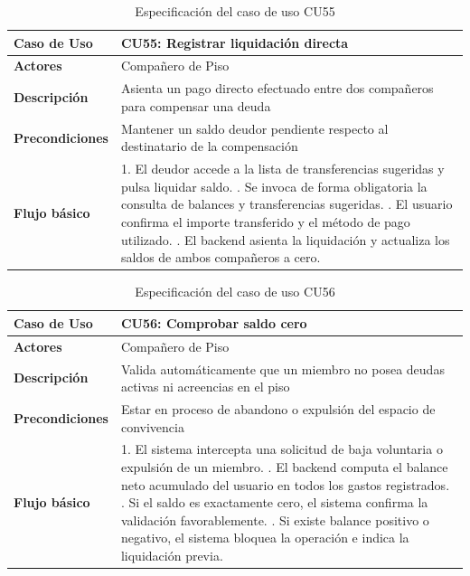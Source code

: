 \begin{table}[H]
\centering
\begin{tabular}{|p{3.2cm}|p{11.3cm}|}
\hline
\textbf{Caso de Uso} & \textbf{CU55: Registrar liquidación directa} \\ \hline
\textbf{Actores} & Compañero de Piso \\ \hline
\textbf{Descripción} & Asienta un pago directo efectuado entre dos compañeros para compensar una deuda \\ \hline
\textbf{Precondiciones} & Mantener un saldo deudor pendiente respecto al destinatario de la compensación \\ \hline
\textbf{Flujo básico} & 
1. El deudor accede a la lista de transferencias sugeridas y pulsa liquidar saldo. \newline
2. Se invoca de forma obligatoria la consulta de balances y transferencias sugeridas. \newline
3. El usuario confirma el importe transferido y el método de pago utilizado. \newline
4. El backend asienta la liquidación y actualiza los saldos de ambos compañeros a cero. \\ \hline
\end{tabular}
\caption{Especificación del caso de uso CU55}
\label{tab:cu55}
\end{table}

\begin{table}[H]
\centering
\begin{tabular}{|p{3.2cm}|p{11.3cm}|}
\hline
\textbf{Caso de Uso} & \textbf{CU56: Comprobar saldo cero} \\ \hline
\textbf{Actores} & Compañero de Piso \\ \hline
\textbf{Descripción} & Valida automáticamente que un miembro no posea deudas activas ni acreencias en el piso \\ \hline
\textbf{Precondiciones} & Estar en proceso de abandono o expulsión del espacio de convivencia \\ \hline
\textbf{Flujo básico} & 
1. El sistema intercepta una solicitud de baja voluntaria o expulsión de un miembro. \newline
2. El backend computa el balance neto acumulado del usuario en todos los gastos registrados. \newline
3. Si el saldo es exactamente cero, el sistema confirma la validación favorablemente. \newline
4. Si existe balance positivo o negativo, el sistema bloquea la operación e indica la liquidación previa. \\ \hline
\end{tabular}
\caption{Especificación del caso de uso CU56}
\label{tab:cu56}
\end{table}